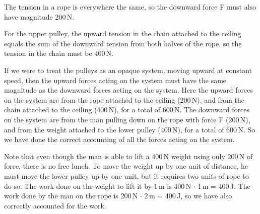 \documentclass{amsart}
\begin{document}
The tension in a rope is everywhere the same, so the downward force F must also have magnitude 200\,N.

For the upper pulley, the upward tension in the chain attached to the ceiling equals the sum of the downward tension from
both halves of the rope, so the tension in the chain must be 400\,N.

If we were to treat the pulleys as an opaque system, moving upward at constant speed, then the upward
forces acting on the system must have the same magnitude as the downward forces acting on the system.
Here the upward forces on the system are from the rope attached to the ceiling (200\,N),
and from the chain attached to the ceiling (400\,N), for a total of 600\,N.
The downward forces on the system are from the man pulling down on the rope with force F (200\,N),
and from the weight attached to the lower pulley (400\,N), for a total of 600\,N.
So we have done the correct accounting of all the forces acting on the system.

Note that even though the man is able to lift a 400\,N weight using only 200\,N of force,
there is no free lunch.  To move the weight up by one unit of distance, he must move the lower pulley up
by one unit, but it requires two units of rope to do so.
The work done on the weight to lift it by 1\,m is 400\,N $\cdot$ 1\,m = 400\,J.
The work done by the man on the rope is 200\,N $\cdot$ 2\,m = 400\,J,
so we have also correctly accounted for the work.
\end{document}
